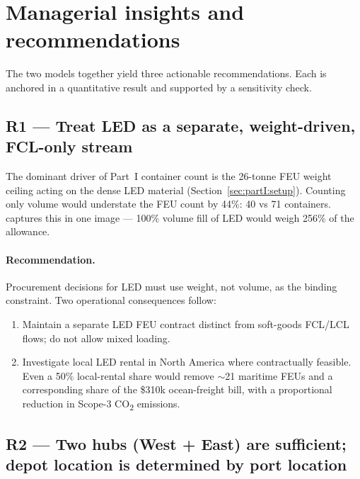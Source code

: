 \documentclass[11pt,a4paper]{article}
\numberwithin{equation}{section}
\newcommand{\USD}[1]{\$#1}
\begin{document}
\section{Managerial insights and recommendations}\label{sec:recommendations}

The two models together yield three actionable recommendations. Each is anchored in a quantitative result and supported by a sensitivity check.

\subsection{R1 --- Treat LED as a separate, weight-driven, FCL-only stream}

The dominant driver of Part~I container count is the 26-tonne FEU weight ceiling acting on the dense LED material (Section~\ref{sec:partI:setup}). Counting only volume would understate the FEU count by 44\%: 40 vs 71 containers.  captures this in one image — 100\% volume fill of LED would weigh 256\% of the allowance.

\paragraph{Recommendation.} Procurement decisions for LED must use weight, not volume, as the binding constraint. Two operational consequences follow:
\begin{enumerate}[leftmargin=*,itemsep=2pt,topsep=2pt]
\item Maintain a separate LED FEU contract distinct from soft-goods FCL/LCL flows; do not allow mixed loading.
\item Investigate local LED rental in North America where contractually feasible. Even a 50\% local-rental share would remove $\sim$21 maritime FEUs and a corresponding share of the \USD{310k} ocean-freight bill, with a proportional reduction in Scope-3 CO\textsubscript{2} emissions.
\end{enumerate}

\subsection{R2 --- Two hubs (West + East) are sufficient; depot location is determined by port location}
\end{document}
